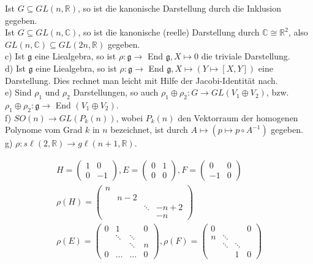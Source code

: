 \documentclass[10pt, letterpaper]{article}
\begin{document}
Ist $G \subseteq G L(n, \mathbb{R})$, so ist die kanonische Darstellung durch die Inklusion gegeben.\\
Ist $G \subseteq G L(n, \mathbb{C})$, so ist die kanonische (reelle) Darstellung durch $\mathbb{C} \cong \mathbb{R}^{2}$, also $G L(n, \mathbb{C}) \subseteq G L(2 n, \mathbb{R})$ gegeben.\\
c) Ist $\mathfrak{g}$ eine Liealgebra, so ist $\rho: \mathfrak{g} \rightarrow$ End $\mathfrak{g}, X \mapsto 0$ die triviale Darstellung.\\
d) Ist $\mathfrak{g}$ eine Liealgebra, so ist $\rho: \mathfrak{g} \rightarrow$ End $\mathfrak{g}, X \mapsto(Y \mapsto[X, Y])$ eine Darstellung. Dies rechnet man leicht mit Hilfe der Jacobi-Identität nach.\\
e) Sind $\rho_{1}$ und $\rho_{2}$ Darstellungen, so auch $\rho_{1} \oplus \rho_{2}: G \rightarrow G L\left(V_{1} \oplus V_{2}\right)$, bzw. $\rho_{1} \oplus \rho_{2}: \mathfrak{g} \rightarrow$ End $\left(V_{1} \oplus V_{2}\right)$.\\
f) $S O(n) \rightarrow G L\left(P_{k}(n)\right)$, wobei $P_{k}(n)$ den Vektorraum der homogenen Polynome vom Grad $k$ in $n$ bezeichnet, ist durch $A \mapsto\left(p \mapsto p \circ A^{-1}\right)$ gegeben.\\
g) $\rho: s \ell(2, \mathbb{R}) \rightarrow g \ell(n+1, \mathbb{R})$.

$$
\begin{gathered}
H=\left(\begin{array}{cc}
1 & 0 \\
0 & -1
\end{array}\right), E=\left(\begin{array}{ll}
0 & 1 \\
0 & 0
\end{array}\right), F=\left(\begin{array}{cc}
0 & 0 \\
-1 & 0
\end{array}\right) \\
\rho(H)=\left(\begin{array}{llll}
n & & & \\
& n-2 & & \\
& & \ddots & -n+2 \\
& & & -n
\end{array}\right) \\
\rho(E)=\left(\begin{array}{llll}
0 & 1 & & 0 \\
& \ddots & \ddots & \\
& & \ddots & n \\
0 & \ldots & \ldots & 0
\end{array}\right), \rho(F)=\left(\begin{array}{llll}
0 & & & 0 \\
n & \ddots & & \\
& \ddots & \ddots & \\
& & 1 & 0
\end{array}\right)
\end{gathered}
$$
\end{document}
